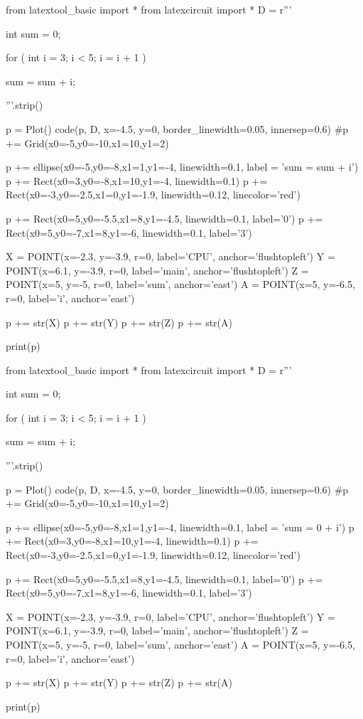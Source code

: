 \begin{python}
from latextool_basic import *
from latexcircuit import *
D = r'''



int sum = 0;

    for ( int i = 3;     i < 5;     i = i + 1 )


        sum = sum + i;



'''.strip()

p = Plot()
code(p, D, x=-4.5, y=0, border_linewidth=0.05, innersep=0.6)
#p += Grid(x0=-5,y0=-10,x1=10,y1=2)

p += ellipse(x0=-5,y0=-8,x1=1,y1=-4, linewidth=0.1, label = 'sum = sum + i')
p += Rect(x0=3,y0=-8,x1=10,y1=-4, linewidth=0.1)
p += Rect(x0=-3,y0=-2.5,x1=0,y1=-1.9, linewidth=0.12, linecolor='red')

p += Rect(x0=5,y0=-5.5,x1=8,y1=-4.5, linewidth=0.1, label='0')
p += Rect(x0=5,y0=-7,x1=8,y1=-6, linewidth=0.1, label='3')

X = POINT(x=-2.3, y=-3.9, r=0, label='CPU', anchor='flushtopleft')
Y = POINT(x=6.1, y=-3.9, r=0, label='main', anchor='flushtopleft')
Z = POINT(x=5, y=-5, r=0, label='sum', anchor='east')
A = POINT(x=5, y=-6.5, r=0, label='i', anchor='east')

p += str(X)
p += str(Y)
p += str(Z)
p += str(A)

print(p)
\end{python}

\begin{python}
from latextool_basic import *
from latexcircuit import *
D = r'''



int sum = 0;

    for ( int i = 3;     i < 5;     i = i + 1 )


        sum = sum + i;



'''.strip()

p = Plot()
code(p, D, x=-4.5, y=0, border_linewidth=0.05, innersep=0.6)
#p += Grid(x0=-5,y0=-10,x1=10,y1=2)

p += ellipse(x0=-5,y0=-8,x1=1,y1=-4, linewidth=0.1, label = 'sum = 0 + i')
p += Rect(x0=3,y0=-8,x1=10,y1=-4, linewidth=0.1)
p += Rect(x0=-3,y0=-2.5,x1=0,y1=-1.9, linewidth=0.12, linecolor='red')

p += Rect(x0=5,y0=-5.5,x1=8,y1=-4.5, linewidth=0.1, label='0')
p += Rect(x0=5,y0=-7,x1=8,y1=-6, linewidth=0.1, label='3')

X = POINT(x=-2.3, y=-3.9, r=0, label='CPU', anchor='flushtopleft')
Y = POINT(x=6.1, y=-3.9, r=0, label='main', anchor='flushtopleft')
Z = POINT(x=5, y=-5, r=0, label='sum', anchor='east')
A = POINT(x=5, y=-6.5, r=0, label='i', anchor='east')

p += str(X)
p += str(Y)
p += str(Z)
p += str(A)

print(p)
\end{python}

